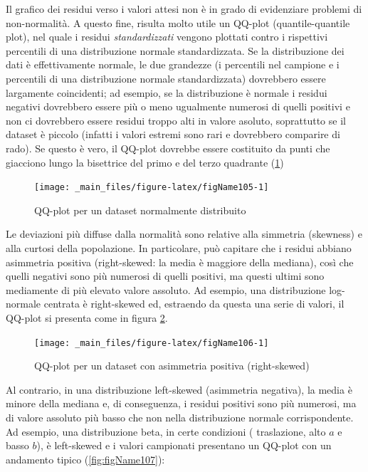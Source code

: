\documentclass[a4paper,12pt,oneside]{book}
\begin{document}
Il grafico dei residui verso i valori attesi non è in grado di evidenziare problemi di non-normalità. A questo fine, risulta molto utile un QQ-plot (quantile-quantile plot), nel quale i residui \emph{standardizzati} vengono plottati contro i rispettivi percentili di una distribuzione normale standardizzata. Se la distribuzione dei dati è effettivamente normale, le due grandezze (i percentili nel campione e i percentili di una distribuzione normale standardizzata) dovrebbero essere largamente coincidenti; ad esempio, se la distribuzione è normale i residui negativi dovrebbero essere più o meno ugualmente numerosi di quelli positivi e non ci dovrebbero essere residui troppo alti in valore asoluto, soprattutto se il dataset è piccolo (infatti i valori estremi sono rari e dovrebbero comparire di rado). Se questo è vero, il QQ-plot dovrebbe essere costituito da punti che giacciono lungo la bisettrice del primo e del terzo quadrante (\ref{fig:figName105})

\begin{figure}

{\centering \texttt{[image: \_main\_files/figure-latex/figName105-1]} 

}

\caption{QQ-plot per un dataset normalmente distribuito}\label{fig:figName105}
\end{figure}

Le deviazioni più diffuse dalla normalità sono relative alla simmetria (skewness) e alla curtosi della popolazione. In particolare, può capitare che i residui abbiano asimmetria positiva (right-skewed: la media è maggiore della mediana), così che quelli negativi sono più numerosi di quelli positivi, ma questi ultimi sono mediamente di più elevato valore assoluto. Ad esempio, una distribuzione log-normale centrata è right-skewed ed, estraendo da questa una serie di valori, il QQ-plot si presenta come in figura \ref{fig:figName106}.

\begin{figure}

{\centering \texttt{[image: \_main\_files/figure-latex/figName106-1]} 

}

\caption{QQ-plot per un dataset con asimmetria positiva (right-skewed)}\label{fig:figName106}
\end{figure}

Al contrario, in una distribuzione left-skewed (asimmetria negativa), la media è minore della mediana e, di conseguenza, i residui positivi sono più numerosi, ma di valore assoluto più basso che non nella distribuzione normale corrispondente. Ad esempio, una distribuzione beta, in certe condizioni ( traslazione, alto \(a\) e basso \(b\)), è left-skewed e i valori campionati presentano un QQ-plot con un andamento tipico (\ref{fig:figName107}):
\end{document}
